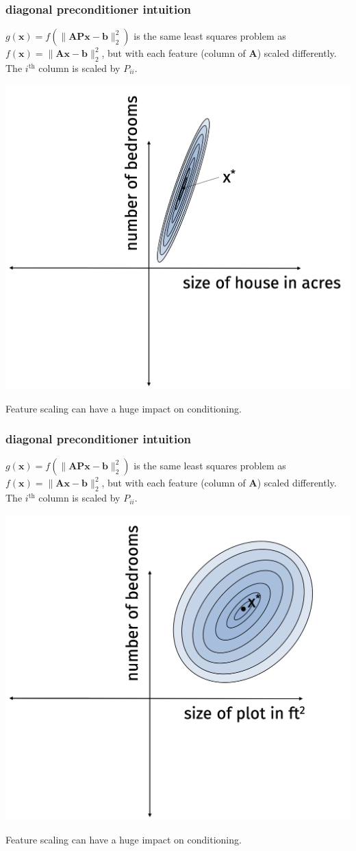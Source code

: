 \documentclass[compress]{beamer}
\newcommand{\bv}[1]{\mathbf{#1}}
\begin{document}
\begin{frame}
	\frametitle{diagonal preconditioner intuition}
	$g(\bv{x}) = f(\|\bv{A}\bv{P}\bv{x} - \bv{b}\|_2^2)$ is the same least squares problem as $f(\bv{x}) = \|\bv{A}\bv{x} - \bv{b}\|_2^2$, but with each feature (column of $\bv{A}$) scaled differently. The $i^\text{th}$ column is scaled by $P_{ii}$. 
	\begin{center}
	\vspace{-.5em}
	\includegraphics[width=.6\textwidth]{bad_scaling.png}
	\vspace{-.5em}
	
	Feature scaling can have a huge impact on conditioning. 
	\end{center}
\end{frame}

\begin{frame}
	\frametitle{diagonal preconditioner intuition}
	$g(\bv{x}) = f(\|\bv{A}\bv{P}\bv{x} - \bv{b}\|_2^2)$ is the same least squares problem as $f(\bv{x}) = \|\bv{A}\bv{x} - \bv{b}\|_2^2$, but with each feature (column of $\bv{A}$) scaled differently. The $i^\text{th}$ column is scaled by $P_{ii}$. 
	\begin{center}
		\vspace{-.5em}
		\includegraphics[width=.6\textwidth]{well_conditioned.png}
		\vspace{-.5em}
		
		Feature scaling can have a huge impact on conditioning. 
	\end{center}
\end{frame}
\end{document}
